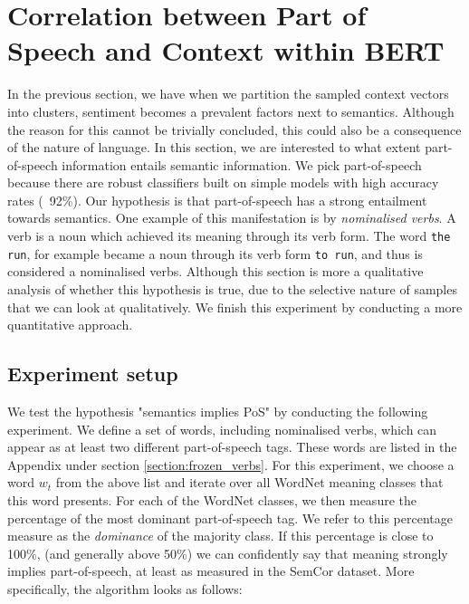 \documentclass[a4paper,12pt,twoside,openright]{report}
\begin{document}
\section{Correlation between Part of Speech and Context within BERT} \label{correlation_pos_context}

In the previous section, we have when we partition the sampled context vectors into clusters, sentiment becomes a prevalent factors next to semantics.
Although the reason for this cannot be trivially concluded, this could also be a consequence of the nature of language.
In this section, we are interested to what extent part-of-speech information entails semantic information.
We pick part-of-speech because there are robust classifiers built on simple models with high accuracy rates (~92\%).
Our hypothesis is that part-of-speech has a strong entailment towards semantics.
One example of this manifestation is by \textit{nominalised verbs}.
A  verb is a noun which achieved its meaning through its verb form.
The word \Verb#the run#, for example became a noun through its verb form \Verb#to run#, and thus is considered a nominalised verbs.
Although this section is more a qualitative analysis of whether this hypothesis is true, due to the selective nature of samples that we can look at qualitatively.
We finish this experiment by conducting a more  quantitative approach.

\subsection{Experiment setup}

We test the hypothesis "semantics implies PoS" by conducting the following experiment.
We define a set of words, including nominalised verbs, which can appear as at least two different part-of-speech tags.
These words are listed in the Appendix under section \eqref{section:frozen_verbs}.
For this experiment, we choose a word $w_t$ from the above list and iterate over all WordNet meaning classes that this word presents.
For each of the WordNet classes, we then measure the percentage of the most dominant part-of-speech tag.
We refer to this percentage measure as the \textit{dominance} of the majority class.
If this percentage is close to 100\%, (and generally above 50\%) we can confidently say that meaning strongly implies part-of-speech, at least as measured in the SemCor dataset.
More specifically, the algorithm looks as follows:
\end{document}
